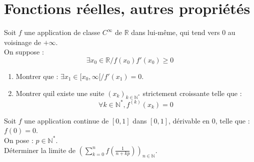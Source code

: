 \section{Fonctions réelles, autres propriétés}

\begin{exer}
Soit $f$ une application de classe $C^{\infty}$ de $\mathbb{R}$ dans lui-m\^eme, qui tend vers $0$ au voisinage de $+ \infty$.\\
On suppose :\[\exists x_0 \in \mathbb{R} / f(x_0)f'(x_0) \geqslant 0\]
\begin{enumerate}
\item Montrer que : $\exists x_1 \in [x_0 , \infty[ / f'(x_1) = 0$.
\item Montrer quil existe une suite $(x_k)_{k \in \mathbb{N}^{\ast}}$ strictement croissante telle que :
\[\forall k \in \mathbb{N}^{\ast} , f^{(k)} (x_k) = 0\]
\end{enumerate}
\end{exer}

\begin{exer}%
Soit $f$ une application continue de $[0,1]$ dans $[0,1]$, dérivable en $0$, telle que : $f(0) = 0$.\\
On pose : $p \in \mathbb{N}^*$.\\
Déterminer la limite de $\left(\sum\limits_{k=0}^n f\left(\frac{1}{n+kp}\right)\right)_{n\in\mathbb{N}}$. 
\end{exer}